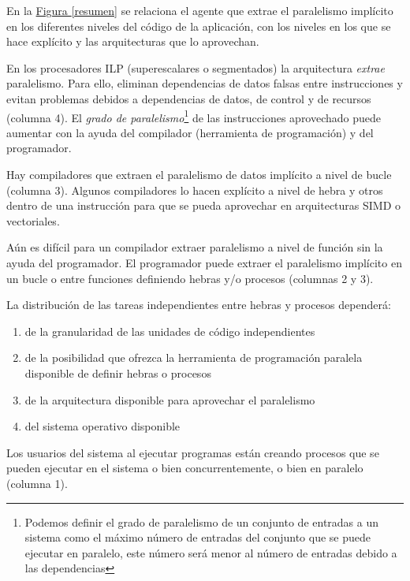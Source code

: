 \documentclass[10pt,a4paper,spanish]{report}
\begin{document}
En la \hyperref[resumen]{Figura \ref*{resumen}} se relaciona el agente que extrae el paralelismo implícito en los diferentes niveles del código de la aplicación, con los niveles en los que se hace explícito y las arquitecturas que lo aprovechan.

En los procesadores ILP (superescalares o segmentados) la arquitectura \textit{\textcolor[rgb]{0.2,0.4,0.8}{extrae}} paralelismo. Para ello, eliminan dependencias de datos falsas entre instrucciones y evitan problemas debidos a dependencias de datos, de control y de recursos (columna 4). El \textit{\textcolor[rgb]{0.2,0.4,0.8}{grado de paralelismo}}\footnote{Podemos definir el grado de paralelismo de un conjunto de entradas a un sistema como el máximo número de entradas del conjunto que se puede ejecutar en paralelo, este número será menor al número de entradas debido a las dependencias} de las instrucciones aprovechado puede aumentar con la ayuda del compilador (herramienta de programación) y del programador.

Hay compiladores que extraen el paralelismo de datos implícito a nivel de bucle (columna 3). Algunos compiladores lo hacen explícito a nivel de hebra y otros dentro de una instrucción para que se pueda aprovechar en arquitecturas SIMD o vectoriales.

Aún es difícil para un compilador extraer paralelismo a nivel de función sin la ayuda del programador. El programador puede extraer el paralelismo implícito en un bucle o entre funciones definiendo hebras y/o procesos (columnas 2 y 3).

La distribución de las tareas independientes entre hebras y procesos dependerá:
\begin{enumerate}[\color{azul}{\bf $\heartsuit$}]
    \item de la granularidad de las unidades de código independientes
    \item de la posibilidad que ofrezca la herramienta de programación paralela disponible de definir hebras o procesos
    \item de la arquitectura disponible para aprovechar el paralelismo
    \item del sistema operativo disponible
\end{enumerate}

Los usuarios del sistema al ejecutar programas están creando procesos que se pueden ejecutar en el sistema o bien concurrentemente, o bien en paralelo (columna 1).
\end{document}
